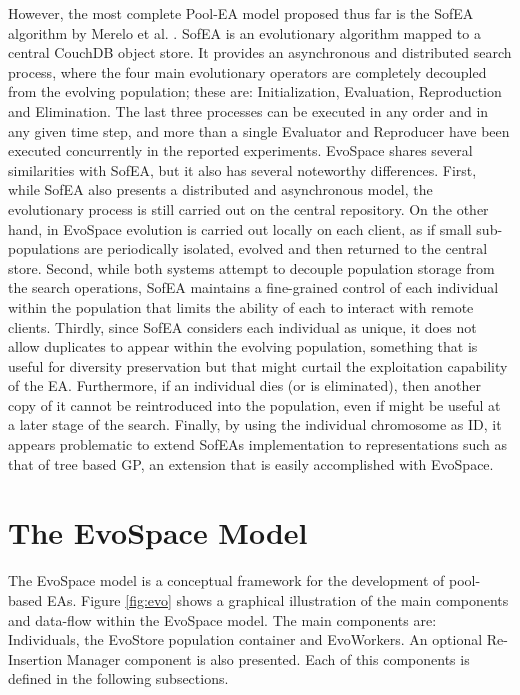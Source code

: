However, the most complete Pool-EA model proposed thus far is the SofEA algorithm by Merelo et al. \cite{sofea1,sofea2}.
SofEA is an evolutionary algorithm mapped to a central CouchDB object store. It provides an asynchronous and distributed search process,
where the four main evolutionary operators are completely decoupled from the evolving population; these are: Initialization, Evaluation, Reproduction and Elimination.
The last three processes can be executed in any order and in any given time step, and more than a single Evaluator and Reproducer have been executed concurrently
in the reported experiments.
EvoSpace shares several similarities with SofEA, but it also has several noteworthy differences.
First, while SofEA also presents a distributed and asynchronous model, the evolutionary process is still carried out on the central repository.
On the other hand, in EvoSpace evolution is carried out locally on each client, as if small sub-populations are periodically isolated, evolved and then returned to the central store.
Second, while both systems attempt to decouple population storage from the search operations, SofEA maintains a fine-grained control of each individual
within the population that limits the ability of each to interact with remote clients.
Thirdly, since SofEA considers each individual as unique, it does not allow duplicates to appear within the evolving population, something that is useful for diversity preservation but that might curtail the exploitation capability of the EA.
Furthermore, if an individual dies (or is eliminated), then another copy of it cannot be reintroduced into the population, even if might be useful
at a later stage of the search.
Finally, by using the individual chromosome as ID, it appears problematic to extend SofEAs implementation to representations such as that of
tree based GP, an extension that is easily accomplished with EvoSpace.

\section{The EvoSpace Model} %
\label{sec:evospace}
The EvoSpace model is a conceptual framework for the development of pool-based EAs. Figure \ref{fig:evo} shows a graphical illustration of the main components and data-flow within the EvoSpace model. The main components are: Individuals, the EvoStore population container and EvoWorkers. An optional Re-Insertion  Manager component is also presented. Each of this components is defined in the following subsections.

